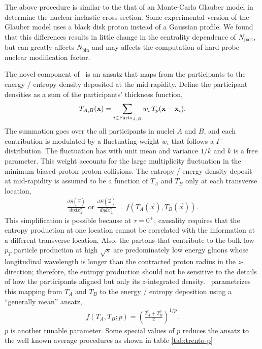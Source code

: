 The above procedure is similar to the that of an Monte-Carlo Glauber model in determine the nuclear inelastic cross-section.
Some experimental version of the Glauber model uses a black disk proton instead of a Gaussian profile.
We found that this differences results in little change in the centrality dependence of $N_{\textrm{part}}$, but can greatly affects $N_{\textrm{bin}}$ and may affects the computation of hard probe nuclear modification factor.

The novel component of \trento\ is an ansatz that maps from the participants to the energy / entropy density deposited at the mid-rapidity.
Define the participant densities as a sum of the participants' thickness function,
\begin{equation}
T_{A, B}(\mathbf x) = \sum_{i\in \textrm{Parts}_{A, B}} w_i\, T_p(\mathbf x - \mathbf x_i).
\end{equation}
The summation goes over the all participants in nuclei $A$ and $B$, and each contribution is modulated by a fluctuating weight $w_i$ that follows a $\Gamma$-distribution.
The fluctuation has with unit mean and variance $1/k$ and $k$ is a free parameter.
This weight accounts for the large multiplicity fluctuation in the minimum biased proton-proton collisions.
The entropy / energy density deposit at mid-rapidity is assumed to be a function of $T_A$ and $T_B$ only at each transverse location,
\begin{eqnarray}
\frac{dS(\vec{x})}{d\eta dx_\perp^2} \textrm{ or } \frac{dE(\vec{x})}{d\eta dx_\perp^2} = f(T_A(\vec{x}), T_B(\vec{x})).
\end{eqnarray}
This simplification is possible because at $\tau=0^+$, causality requires that the entropy production at one location cannot be correlated with the information at a different transverse location. 
Also, the partons that contribute to the bulk low-$p_T$ particle production at high $\sqrt{s}$ are predominately low energy gluons whose longitudinal wavelength is longer than the contracted proton radius in the $z$-direction; therefore, the entropy production should not be sensitive to the details of how the participants aligned but only its $z$-integrated density.
\trento\ parametrizes this mapping from $T_A$ and $T_B$ to the energy / entropy deposition using a ``generally mean'' ansatz,
\begin{eqnarray}
f(T_A, T_B; p) = \left(\frac{T_A^p + T_B^p}{2}\right)^{1/p}.
\end{eqnarray}
$p$ is another tunable parameter.
Some special values of $p$ reduces the ansatz to the well known average procedures as shown in table \ref{tab:trento-p}
